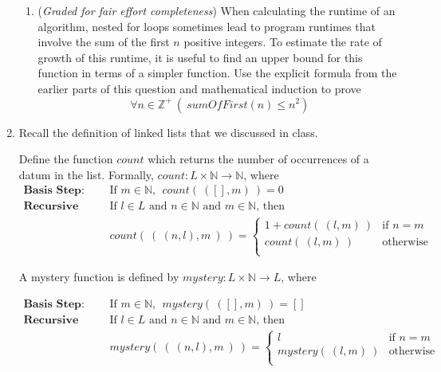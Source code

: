 \documentclass[12pt, oneside]{article}
\begin{document}
\begin{enumerate}
\begin{enumerate}
        \item ({\it Graded for fair effort completeness})
        When calculating the runtime of an algorithm, nested for loops sometimes lead to program 
        runtimes that involve the sum of the first $n$ positive integers. To estimate
        the rate of growth of this runtime, it is useful to find an upper bound for this function 
        in terms of a simpler function.  Use the explicit formula from the earlier parts of this question
        and mathematical induction to prove
        \[
            \forall n \in \mathbb{Z}^+~ \left(~sumOfFirst(n) \leq n^2 \right)
        \]

   \end{enumerate}

   \item Recall the definition of linked lists that we discussed in class.


   Define the function $count$ which returns the number of occurrences of a datum
   in the list. Formally, $count: L \times \mathbb{N} \to \mathbb{N}$, where
   \begin{align*}
    \textbf{Basis Step:} \qquad &\textrm{If } m \in \mathbb{N},~~ count(~( [], m)~ ) = 0 \\ 
    \textbf{Recursive Step:} \qquad &\textrm{If } l \in L\textrm{ and }n \in \mathbb{N}
    \textrm{ and }m \in \mathbb{N} \textrm{, then  } \\
    &count(~(~(n, l),m~)~ ) = 
        \begin{cases}
            1 + count(~(l,m)~) &\text{if $n=m$} \\
            count(~(l,m)~) &\text{otherwise} \\
        \end{cases}
    \end{align*}

    A mystery function is defined by 
    $mystery : L \times \mathbb{N} \to L$, where

    \begin{align*}
    \textbf{Basis Step:} \qquad &\textrm{If } m \in \mathbb{N},~~ mystery(~( [], m)~ ) = [] \\ 
    \textbf{Recursive Step:} \qquad &\textrm{If } l \in L\textrm{ and }n \in \mathbb{N}
    \textrm{ and }m \in \mathbb{N} \textrm{, then  } \\
    &mystery(~(~(n, l),m~)~ ) = 
        \begin{cases}
            l &\text{if $n=m$} \\
            mystery(~(l,m)~) &\text{otherwise} \\
        \end{cases}
    \end{align*}


\end{enumerate}
\end{document}

